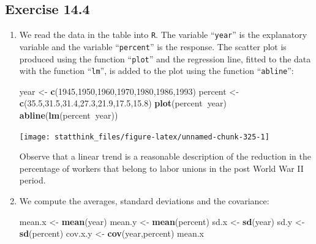 \documentclass[]{krantz}
\makeatletter
\newenvironment{Shaded}{\begin{snugshade}}{\end{snugshade}}
\newcommand{\KeywordTok}[1]{\textcolor[rgb]{0.13,0.29,0.53}{\textbf{#1}}}
\newcommand{\DecValTok}[1]{\textcolor[rgb]{0.00,0.00,0.81}{#1}}
\newcommand{\FloatTok}[1]{\textcolor[rgb]{0.00,0.00,0.81}{#1}}
\newcommand{\StringTok}[1]{\textcolor[rgb]{0.31,0.60,0.02}{#1}}
\newcommand{\OperatorTok}[1]{\textcolor[rgb]{0.81,0.36,0.00}{\textbf{#1}}}
\newcommand{\NormalTok}[1]{#1}
\newenvironment{kframe}{%
\medskip{}
\setlength{\fboxsep}{.8em}
 \def\at@end@of@kframe{}%
 \ifinner\ifhmode%
  \def\at@end@of@kframe{\end{minipage}}%
  \begin{minipage}{\columnwidth}%
 \fi\fi%
 \def\FrameCommand##1{\hskip\@totalleftmargin \hskip-\fboxsep
 \colorbox{shadecolor}{##1}\hskip-\fboxsep
     \hskip-\linewidth \hskip-\@totalleftmargin \hskip\columnwidth}%
 \MakeFramed {\advance\hsize-\width
   \@totalleftmargin\z@ \linewidth\hsize
   \@setminipage}}%
 {\par\unskip\endMakeFramed%
 \at@end@of@kframe}
\renewenvironment{Shaded}{\begin{kframe}}{\end{kframe}}
\theoremstyle{definition}
\theoremstyle{definition}
\theoremstyle{definition}
\theoremstyle{remark}
\makeatother
\begin{document}
\subsection*{Exercise 14.4}\label{exercise-14.4}


\begin{enumerate}
\def\labelenumi{\arabic{enumi}.}
\item
  We read the data in the table into \texttt{R}. The variable
  ``\texttt{year}'' is the explanatory variable and the variable
  ``\texttt{percent}'' is the response. The scatter plot is produced
  using the function ``\texttt{plot}'' and the regression line, fitted
  to the data with the function ``\texttt{lm}'', is added to the plot
  using the function ``\texttt{abline}'':

\begin{Shaded}
\begin{Highlighting}[]
\NormalTok{year <-}\StringTok{ }\KeywordTok{c}\NormalTok{(}\DecValTok{1945}\NormalTok{,}\DecValTok{1950}\NormalTok{,}\DecValTok{1960}\NormalTok{,}\DecValTok{1970}\NormalTok{,}\DecValTok{1980}\NormalTok{,}\DecValTok{1986}\NormalTok{,}\DecValTok{1993}\NormalTok{)}
\NormalTok{percent <-}\StringTok{ }\KeywordTok{c}\NormalTok{(}\FloatTok{35.5}\NormalTok{,}\FloatTok{31.5}\NormalTok{,}\FloatTok{31.4}\NormalTok{,}\FloatTok{27.3}\NormalTok{,}\FloatTok{21.9}\NormalTok{,}\FloatTok{17.5}\NormalTok{,}\FloatTok{15.8}\NormalTok{)}
\KeywordTok{plot}\NormalTok{(percent}\OperatorTok{~}\NormalTok{year)}
\KeywordTok{abline}\NormalTok{(}\KeywordTok{lm}\NormalTok{(percent}\OperatorTok{~}\NormalTok{year))}
\end{Highlighting}
\end{Shaded}

  \begin{center}\texttt{[image: statthink\_files/figure-latex/unnamed-chunk-325-1]} \end{center}

  Observe that a linear trend is a reasonable description of the
  reduction in the percentage of workers that belong to labor unions in
  the post World War II period.
\item
  We compute the averages, standard deviations and the covariance:

\begin{Shaded}
\begin{Highlighting}[]
\NormalTok{mean.x <-}\StringTok{ }\KeywordTok{mean}\NormalTok{(year)}
\NormalTok{mean.y <-}\StringTok{ }\KeywordTok{mean}\NormalTok{(percent)}
\NormalTok{sd.x <-}\StringTok{ }\KeywordTok{sd}\NormalTok{(year)}
\NormalTok{sd.y <-}\StringTok{ }\KeywordTok{sd}\NormalTok{(percent)}
\NormalTok{cov.x.y <-}\StringTok{ }\KeywordTok{cov}\NormalTok{(year,percent)}
\NormalTok{mean.x}
\end{Highlighting}
\end{Shaded}


\end{enumerate}
\end{document}
